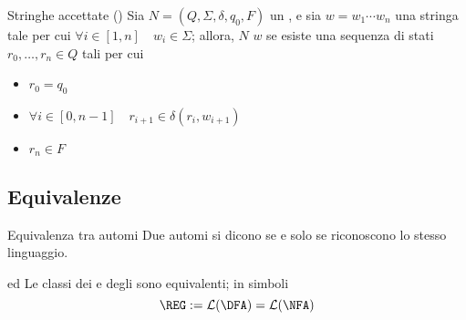 \documentclass[a4paper, 12pt]{report}
\begin{document}
    \begin{frameddefn}{Stringhe accettate (\NFA)}
        Sia $N = (Q, \Sigma, \delta, q_0, F)$ un \NFA, e sia $w = w_1\cdots w_n$ una stringa tale per cui $\forall i \in [1, n] \quad w_i \in \Sigma$; allora, $N$  $w$ se esiste una sequenza di stati $r_0, \ldots, r_n \in Q$ tali per cui

        \begin{itemize}
            \item $r_0 = q_0$
            \item $\forall i \in [0, n - 1] \quad r_{i + 1} \in \delta(r_i, w_{i + 1})$
            \item $r_n \in F$
        \end{itemize}
    \end{frameddefn}

    \subsection{Equivalenze}

    \begin{frameddefn}{Equivalenza tra automi}
        Due automi si dicono  se e solo se riconoscono lo stesso linguaggio.
    \end{frameddefn}

    \begin{framedthm}[label={nfa equiv}]{\DFA ed \NFA}
        Le classi dei \DFA e degli \NFA sono equivalenti; in simboli $$\REG := \mathcal{L}(\mathrm{\DFA}) = \mathcal{L}(\mathrm{\NFA}) $$
    \end{framedthm}
\end{document}
